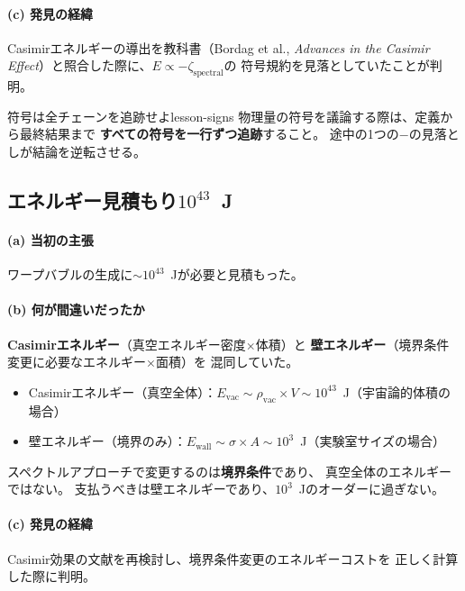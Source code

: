 \documentclass[11pt,a4paper]{article}
\begin{document}
\paragraph{(c) 発見の経緯}
Casimirエネルギーの導出を教科書（Bordag et al., \emph{Advances in the
Casimir Effect}）と照合した際に、$E \propto -\zeta_{\text{spectral}}$の
符号規約を見落としていたことが判明。

\begin{keylesson}{符号は全チェーンを追跡せよ}{lesson-signs}
物理量の符号を議論する際は、定義から最終結果まで
\textbf{すべての符号を一行ずつ追跡}すること。
途中の1つの$-$の見落としが結論を逆転させる。
\end{keylesson}


\subsection{エネルギー見積もり$10^{43}$~J}
\label{sec:15.8}

\paragraph{(a) 当初の主張}
ワープバブルの生成に$\sim 10^{43}$~Jが必要と見積もった。

\paragraph{(b) 何が間違いだったか}
\textbf{Casimirエネルギー}（真空エネルギー密度$\times$体積）と
\textbf{壁エネルギー}（境界条件変更に必要なエネルギー$\times$面積）を
混同していた。

\begin{itemize}
\item Casimirエネルギー（真空全体）：$E_{\text{vac}} \sim \rho_{\text{vac}} \times V
  \sim 10^{43}$~J（宇宙論的体積の場合）
\item 壁エネルギー（境界のみ）：$E_{\text{wall}} \sim \sigma \times A
  \sim 10^3$~J（実験室サイズの場合）
\end{itemize}

スペクトルアプローチで変更するのは\textbf{境界条件}であり、
真空全体のエネルギーではない。
支払うべきは壁エネルギーであり、$10^3$~Jのオーダーに過ぎない。

\paragraph{(c) 発見の経緯}
Casimir効果の文献を再検討し、境界条件変更のエネルギーコストを
正しく計算した際に判明。
\end{document}
